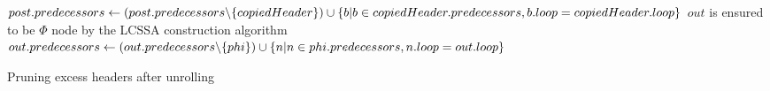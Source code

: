 \begin{algorithm}
    \begin{algorithmic}
                \State {}
            \EndFor
                \State $post.predecessors \gets (post.predecessors \backslash \{copiedHeader\}) \cup \newline \{b \vert  b \in copiedHeader.predecessors, b.loop = copiedHeader.loop\}$
            \EndFor
        \EndFunction
                \Comment $out$ is ensured to be $\Phi$ node by the LCSSA construction algorithm~\cite{aebi18bachelorarbeit}
                    \State $out.predecessors \gets (out.predecessors \backslash \{phi\}) \cup \newline \{n \vert  n \in phi.predecessors, n.loop = out.loop\}$
                \EndIf
            \EndFor
        \EndFunction
    \end{algorithmic}
    \caption{Pruning excess headers after unrolling}
    \label{alg:impl:unroll:prune-headers}
\end{algorithm}